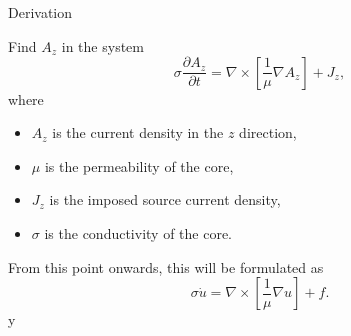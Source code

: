 \begin{frame}[fragile]{Derivation} %
    \begin{problemdef}
        Find $A_z$ in the system
        \begin{equation}
            \sigma\frac{\partial A_z}{\partial t} = \nabla \times \left[\frac{1}{\mu}\nabla A_z\right] + J_z,
        \end{equation}
        where
        \begin{itemize}
            \item $A_z$ is the current density in the $z$ direction,
            \item $\mu$ is the permeability of the core,
            \item $J_z$ is the imposed source current density,
            \item $\sigma$ is the conductivity of the core.
        \end{itemize}
        From this point onwards, this will be formulated as
        \begin{equation}
            \sigma\dot u = \nabla \times \left[\frac{1}{\mu}\nabla u\right] + f.
        \end{equation}y
    \end{problemdef}
\end{frame}
